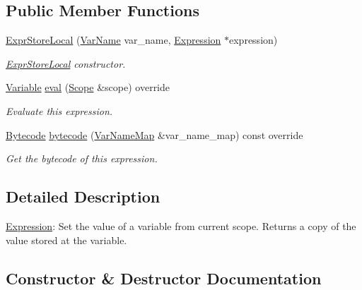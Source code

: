 \subsection*{Public Member Functions}
\begin{DoxyCompactItemize}
\item 
\hyperlink{classcreek_1_1_expr_store_local_ad3a49461210ba0aa74b81bab61007294}{Expr\+Store\+Local} (\hyperlink{classcreek_1_1_var_name}{Var\+Name} var\+\_\+name, \hyperlink{classcreek_1_1_expression}{Expression} $\ast$expression)
\begin{DoxyCompactList}\small\item\em {\ttfamily \hyperlink{classcreek_1_1_expr_store_local}{Expr\+Store\+Local}} constructor. \end{DoxyCompactList}\item 
\hyperlink{classcreek_1_1_variable}{Variable} \hyperlink{classcreek_1_1_expr_store_local_ae61d30ec3ca4e9506d23a435875edb85}{eval} (\hyperlink{classcreek_1_1_scope}{Scope} \&scope) override
\begin{DoxyCompactList}\small\item\em Evaluate this expression. \end{DoxyCompactList}\item 
\hyperlink{classcreek_1_1_bytecode}{Bytecode} \hyperlink{classcreek_1_1_expr_store_local_a79db282478737874c674830a71433c93}{bytecode} (\hyperlink{classcreek_1_1_var_name_map}{Var\+Name\+Map} \&var\+\_\+name\+\_\+map) const  override\hypertarget{classcreek_1_1_expr_store_local_a79db282478737874c674830a71433c93}{}\label{classcreek_1_1_expr_store_local_a79db282478737874c674830a71433c93}

\begin{DoxyCompactList}\small\item\em Get the bytecode of this expression. \end{DoxyCompactList}\end{DoxyCompactItemize}


\subsection{Detailed Description}
\hyperlink{classcreek_1_1_expression}{Expression}\+: Set the value of a variable from current scope. Returns a copy of the value stored at the variable. 

\subsection{Constructor \& Destructor Documentation}
